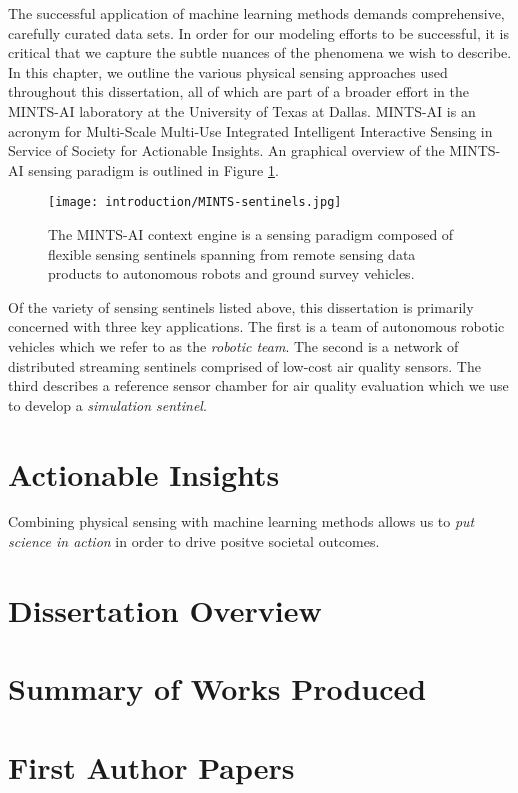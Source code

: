 The successful application of machine learning methods demands comprehensive, carefully curated data sets. In order for our modeling efforts to be successful, it is critical that we capture the subtle nuances of the phenomena we wish to describe. In this chapter, we outline the various physical sensing approaches used throughout this dissertation, all of which are part of a broader effort in the MINTS-AI laboratory at the University of Texas at Dallas. MINTS-AI is an acronym for Multi-Scale Multi-Use Integrated Intelligent Interactive Sensing in Service of Society for Actionable Insights. An graphical overview of the MINTS-AI sensing paradigm is outlined in Figure \ref{fig:mints-ai}.

\begin{figure}[!hbt]
  \centering
  \texttt{[image: introduction/MINTS-sentinels.jpg]}
  \caption{The MINTS-AI context engine is a sensing paradigm composed of flexible sensing sentinels spanning from remote sensing data products to autonomous robots and ground survey vehicles.}
  \label{fig:mints-ai}
\end{figure}

Of the variety of sensing sentinels listed above, this dissertation is primarily concerned with three key applications. The first is a team of autonomous robotic vehicles which we refer to as the \textit{robotic team}. The second is a network of distributed streaming sentinels comprised of low-cost air quality sensors. The third describes a reference sensor chamber for air quality evaluation which we use to develop a \textit{simulation sentinel}.


\section{Actionable Insights}

Combining physical sensing with machine learning methods allows us to \textit{put science in action} in order to drive positve societal outcomes.


\section{Dissertation Overview}

\section{Summary of Works Produced}

\section{First Author Papers}

